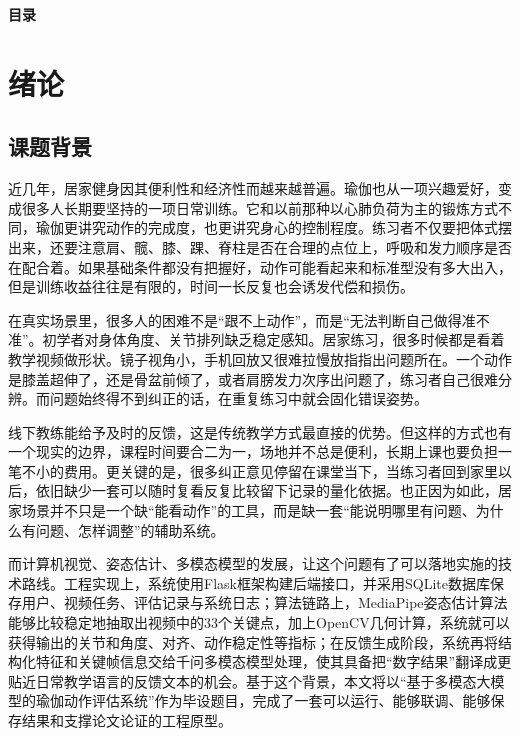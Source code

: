 \documentclass[UTF8,twoside]{ctexrep}
\makeatletter
\def@NAT@last@yr{\@citea}%
\def@NAT@last@yr{-\NAT@penalty}%
\makeatother
\begin{document}
\clearpage
\begin{center}
  {\songti{}\bfseries 目录}
\end{center}
\vspace{1.5em}

\makeatletter
{}
\makeatother

\clearpage
{}

\chapter{绪论}

\section{课题背景}
近几年，居家健身因其便利性和经济性而越来越普遍。瑜伽也从一项兴趣爱好，变成很多人长期要坚持的一项日常训练。它和以前那种以心肺负荷为主的锻炼方式不同，瑜伽更讲究动作的完成度，也更讲究身心的控制程度。练习者不仅要把体式摆出来，还要注意肩、髋、膝、踝、脊柱是否在合理的点位上，呼吸和发力顺序是否在配合着。如果基础条件都没有把握好，动作可能看起来和标准型没有多大出入，但是训练收益往往是有限的，时间一长反复也会诱发代偿和损伤。

在真实场景里，很多人的困难不是“跟不上动作”，而是“无法判断自己做得准不准”。初学者对身体角度、关节排列缺乏稳定感知。居家练习，很多时候都是看着教学视频做形状。镜子视角小，手机回放又很难拉慢放指指出问题所在。一个动作是膝盖超伸了，还是骨盆前倾了，或者肩膀发力次序出问题了，练习者自己很难分辨。而问题始终得不到纠正的话，在重复练习中就会固化错误姿势。

线下教练能给予及时的反馈，这是传统教学方式最直接的优势。但这样的方式也有一个现实的边界，课程时间要合二为一，场地并不总是便利，长期上课也要负担一笔不小的费用。更关键的是，很多纠正意见停留在课堂当下，当练习者回到家里以后，依旧缺少一套可以随时复看反复比较留下记录的量化依据。也正因为如此，居家场景并不只是一个缺“能看动作”的工具，而是缺一套“能说明哪里有问题、为什么有问题、怎样调整”的辅助系统。

而计算机视觉、姿态估计、多模态模型的发展，让这个问题有了可以落地实施的技术路线。工程实现上，系统使用Flask框架\cite{ref_flask}构建后端接口，并采用SQLite数据库\cite{ref_sqlite}保存用户、视频任务、评估记录与系统日志；算法链路上，MediaPipe姿态估计算法\cite{ref_mediapipe}能够比较稳定地抽取出视频中的33个关键点，加上OpenCV\cite{ref_opencv}几何计算，系统就可以获得输出的关节和角度、对齐、动作稳定性等指标；在反馈生成阶段，系统再将结构化特征和关键帧信息交给千问多模态模型\cite{ref_qwen}处理，使其具备把“数字结果”翻译成更贴近日常教学语言的反馈文本的机会。基于这个背景，本文将以“基于多模态大模型的瑜伽动作评估系统”作为毕设题目，完成了一套可以运行、能够联调、能够保存结果和支撑论文论证的工程原型。
\end{document}
